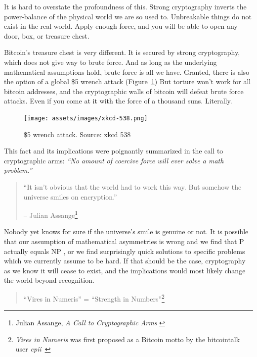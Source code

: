 It is hard to overstate the profoundness of this. Strong cryptography
inverts the power-balance of the physical world we are so used to.
Unbreakable things do not exist in the real world. Apply enough force,
and you will be able to open any door, box, or treasure chest.

Bitcoin's treasure chest is very different. It is secured by strong
cryptography, which does not give way to brute force. And as long as the
underlying mathematical assumptions hold, brute force is all we have.
Granted, there is also the option of a global \$5 wrench attack (Figure~\ref{fig:xkcd-538})
But torture won't work for all bitcoin addresses, and the cryptographic
walls of bitcoin will defeat brute force attacks. Even if you come at it
with the force of a thousand suns. Literally.

\begin{figure}
  \centering
  \texttt{[image: assets/images/xkcd-538.png]}
  \caption{\$5 wrench attack. Source: xkcd 538}
  \label{fig:xkcd-538}
\end{figure}

This fact and its implications were poignantly summarized in the call
to cryptographic arms: \textit{\enquote{No amount of coercive force will ever solve
a math problem.}}

\begin{quotation}\begin{samepage}
\enquote{It isn't obvious that the world had to work this way. But somehow the
universe smiles on encryption.}
\begin{flushright} -- Julian Assange\footnote{Julian Assange, \textit{A Call to Cryptographic Arms} \cite{call-to-cryptographic-arms}}
\end{flushright}\end{samepage}\end{quotation}

Nobody yet knows for sure if the universe's smile is genuine or not. It
is possible that our assumption of mathematical asymmetries is wrong and
we find that P actually equals NP \cite{wiki:pnp}, or we find surprisingly quick
solutions to specific problems \cite{wiki:discrete-log} which we currently assume to be hard.
If that should be the case, cryptography as we know it will cease to
exist, and the implications would most likely change the world beyond
recognition.

\begin{quotation}\begin{samepage}
\enquote{Vires in Numeris} = \enquote{Strength in Numbers}\footnote{\textit{Vires in Numeris} was first proposed as a Bitcoin motto by the bitcointalk user \textit{epii}~\cite{epii}}
\end{samepage}\end{quotation}


